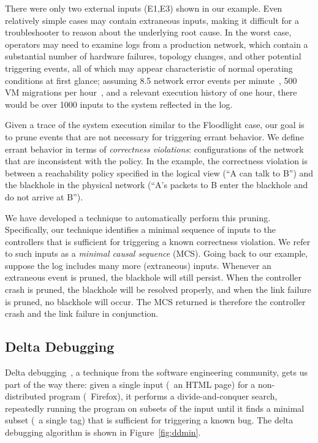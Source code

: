 There were only two external inputs (E1,E3) shown in our example.
Even relatively simple cases may contain extraneous inputs, making it difficult
for a troubleshooter to reason about the underlying root cause.
In the worst case, operators may need to examine logs from a production
network, which contain a substantial number of hardware failures, topology changes,
and other potential triggering events,
all of which may appear characteristic of normal operating
conditions at first glance; assuming 8.5 network error events per
minute~\cite{Greenberg:2009:VSF:1592568.1592576}, 500 VM migrations per
hour~\cite{Soundararajan:2010:CBS:1899928.1899941}, and a relevant execution
history of one hour, there would be over 1000 inputs to the system
reflected in the log.

Given a trace of the system execution similar to the Floodlight case,
our goal is to prune events that are not
necessary for triggering errant behavior. We define errant behavior in terms
of {\em correctness violations}:
configurations of the network that are inconsistent
with the policy. In the example, the correctness violation is between a
reachability policy specified in the logical view (``A can talk to B'')
and the blackhole in the physical network (``A's packets to B enter the
blackhole and do not arrive at B'').

We have developed a technique to automatically perform this pruning.
Specifically, our technique identifies a minimal sequence of inputs
to the controllers that is sufficient for triggering a known correctness violation. We
refer to such inputs as a {\em minimal causal sequence} (MCS). Going back to our example,
suppose the log includes many more (extraneous) inputs. Whenever an
extraneous event is pruned, the blackhole will still persist. When
the controller crash is pruned, the blackhole will be resolved properly, and
when the link failure is pruned, no blackhole will occur. The MCS returned
is therefore the controller crash and the link failure in conjunction.

\subsection{Delta Debugging}
\label{subsec:algorithm}

Delta debugging~\cite{Zeller:2002:SIF:506201.506206}, a technique from the
software engineering community, gets us part of the way
there: given a single input (\eg~an HTML page)
for a non-distributed program (\eg~Firefox), it performs a divide-and-conquer
search, repeatedly running the program on subsets of the input
until it finds a minimal subset (\eg~a single tag) that is sufficient
for triggering a known bug. The delta debugging algorithm is shown in
Figure~\ref{fig:ddmin}.

